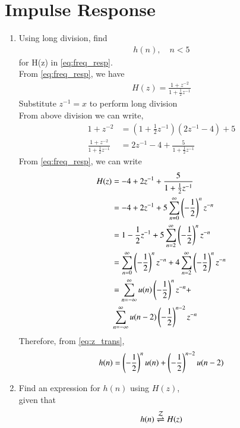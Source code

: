 \documentclass[journal,12pt,twocolumn]{IEEEtran}
\renewcommand\thesection{\arabic{section}}
\begin{document}
\section{Impulse Response}
\begin{enumerate}[label=\thesection.\arabic*]
	\item Using long division, 
find
		\begin{align}
			h(n), \quad n < 5
		\end{align}
		for H(z) in 
		\eqref{eq:freq_resp}.\\
\solution From \eqref{eq:freq_resp}, we have\\
\begin{align}
H(z) = \frac{1 + z^{-2}}{1 + \frac{1}{2}z^{-1}}
\end{align}
Substitute $z^{-1} = x$ to perform long division
\\
From above division we can write,
\begin{align}
1+z^{-2} &= (1+\frac{1}{2}z^{-1})(2z^{-1}-4) + 5\\
\frac{1+z^{-2}}{1+\frac{1}{2}z^{-1}} &= 2z^{-1}-4 + \frac{5}{1+\frac{1}{2}z^{-1}}
\end{align}
From \eqref{eq:freq_resp}, we can write
\begin{align}
H(z) &= -4 + 2z^{-1} + \frac{5}{1 + \frac{1}{2}z^{-1}} \\
&= -4 + 2z^{-1} + 5\sum_{n = 0}^{\infty}\left(-\frac{1}{2}\right)^nz^{-n} \\
&= 1 - \frac{1}{2}z^{-1} + 5\sum_{n = 2}^{\infty}\left(-\frac{1}{2}\right)^nz^{-n} \\
&= \sum_{n = 0}^{\infty}\left(-\frac{1}{2}\right)^nz^{-n} + 4\sum_{n = 2}^{\infty}\left(-\frac{1}{2}\right)^nz^{-n} \\
&= \sum_{n = -\infty}^{\infty}u(n)\left(-\frac{1}{2}\right)^nz^{-n} + \nonumber \\
&\sum_{n = -\infty}^{\infty}u(n - 2)\left(-\frac{1}{2}\right)^{n - 2}z^{-n}
\end{align}
Therefore, from \eqref{eq:z_trans}, 
\begin{align}
	h(n) = \left(-\frac{1}{2}\right)^{n}u(n) + \left(-\frac{1}{2}\right)^{n-2}u(n-2)
\end{align}
\item \label{prob:impulse_resp}
Find an expression for $h(n)$ using $H(z)$,\\ given that 
\begin{equation}
\label{eq:impulse_resp}
h(n) \overset{\mathcal{Z}}{ \rightleftharpoons} H(z)
\end{equation}

\end{enumerate}
\end{document}
